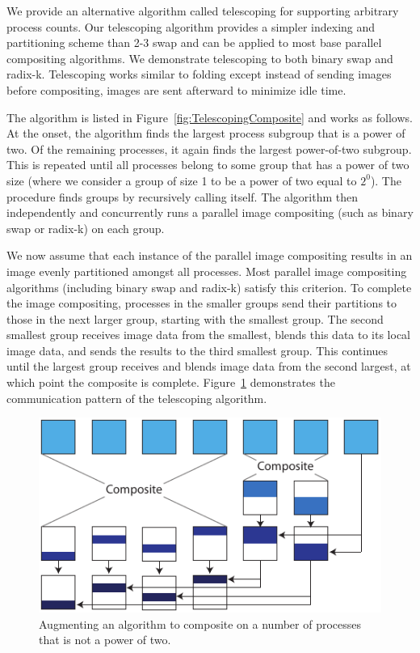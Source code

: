 \documentclass{acm_proc_article-sp}
\begin{document}
We provide an alternative algorithm called telescoping for supporting
arbitrary process counts.  Our telescoping algorithm provides a simpler
indexing and partitioning scheme than 2-3 swap and can be applied to most
base parallel compositing algorithms.  We demonstrate telescoping to both
binary swap and radix-k.  Telescoping works similar to folding except
instead of sending images before compositing, images are sent afterward to
minimize idle time.

The  algorithm is listed in
Figure~\ref{fig:TelescopingComposite} and works as follows.  At the onset,
the algorithm finds the largest process subgroup that is a power of two.
Of the remaining processes, it again finds the largest power-of-two
subgroup.  This is repeated until all processes belong to some group that
has a power of two size (where we consider a group of size 1 to be a power
of two equal to $2^0$).  The  procedure finds
groups by recursively calling itself.  The algorithm then independently and
concurrently runs a parallel image compositing (such as binary swap or
radix-k) on each group.

We now assume that each instance of the parallel image compositing results
in an image evenly partitioned amongst all processes.  Most parallel image
compositing algorithms (including binary swap and radix-k) satisfy this
criterion.  To complete the image compositing, processes in the smaller
groups send their partitions to those in the next larger group, starting
with the smallest group.  The second smallest group receives image data
from the smallest, blends this data to its local image data, and sends the
results to the third smallest group.  This continues until the largest
group receives and blends image data from the second largest, at which
point the composite is complete.  Figure~\ref{fig:TelescopeDiagram}
demonstrates the communication pattern of the telescoping algorithm.

\begin{figure}[htbp]
  \centering
  \includegraphics{images/TelescopeDiagram}
  \caption{Augmenting an algorithm to composite on a number of processes
    that is not a power of two.}
  \label{fig:TelescopeDiagram}
\end{figure}
\end{document}
